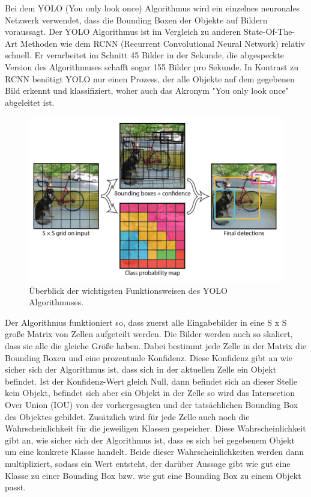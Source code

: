 Bei dem YOLO (You only look once) Algorithmus wird ein einzelnes neuronales Netzwerk verwendet, dass die Bounding Boxen der Objekte auf Bildern voraussagt. Der YOLO Algorithmus ist im Vergleich zu anderen State-Of-The-Art Methoden wie dem RCNN (Recurrent Convolutional Neural Network) relativ schnell. Er verarbeitet im Schnitt 45 Bilder in der Sekunde, die abgespeckte Version des Algorithmuses schafft sogar 155 Bilder pro Sekunde. In Kontrast zu RCNN benötigt YOLO nur einen Prozess, der alle Objekte auf dem gegebenen Bild erkennt und klassifiziert, woher auch das Akronym "You only look once" abgeleitet ist.
\begin{figure}[h]
    \centering
    \includegraphics{images/YOLO_func.PNG}
    \caption{Überblick der wichtigsten Funktionsweisen des YOLO Algorithmuses.}
\end{figure}
\newpage
Der Algorithmus funktioniert so, dass zuerst alle Eingabebilder in eine S x S große Matrix von Zellen aufgeteilt werden. Die Bilder werden auch so skaliert, dass sie alle die gleiche Größe haben. Dabei bestimmt jede Zelle in der Matrix die Bounding Boxen und eine prozentuale Konfidenz. Diese Konfidenz gibt an wie sicher sich der Algorithmus ist, dass sich in der aktuellen Zelle ein Objekt befindet. Ist der Konfidenz-Wert gleich Null, dann befindet sich an dieser Stelle kein Objekt, befindet sich aber ein Objekt in der Zelle so wird das Intersection Over Union (IOU) von der vorhergesagten und der tatsächlichen Bounding Box des Objektes gebildet. Zusätzlich wird für jede Zelle auch noch die Wahrscheinlichkeit für die jeweiligen Klassen gespeicher. Diese Wahrscheinlichkeit gibt an, wie sicher sich der Algorithmus ist, dass es sich bei gegebenem Objekt um eine konkrete Klasse handelt. Beide dieser Wahrscheinlichkeiten werden dann multipliziert, sodass ein Wert entsteht, der darüber Aussage gibt wie gut eine Klasse zu einer Bounding Box bzw. wie gut eine Bounding Box zu einem Objekt passt.\par
